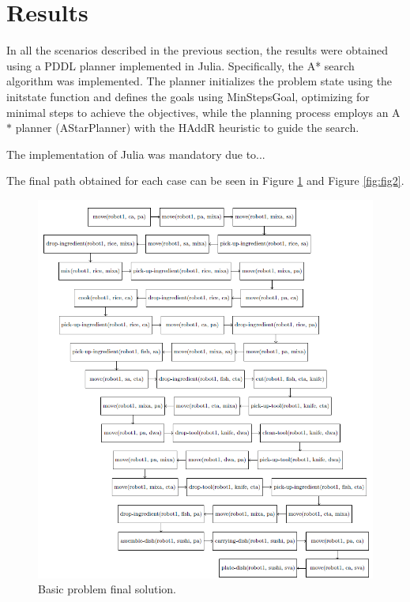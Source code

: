 \section{Results}
In all the scenarios described in the previous section, the results were obtained using a PDDL planner implemented in Julia. 
Specifically, the A* search algorithm was implemented. The planner initializes the problem state using the initstate function and 
defines the goals using MinStepsGoal, optimizing for minimal steps to achieve the objectives, while the planning process employs an A$*$ 
planner (AStarPlanner) with the HAddR heuristic to guide the search.


The implementation of Julia was mandatory due to...


The final path obtained for each case can be seen in Figure \ref{fig:fig1} and Figure \ref{fig:fig2}.

\begin{figure}[t]
    \centering
    \includegraphics[width=1\linewidth]{fig1.png}
    \caption{Basic problem final solution.}
    \label{fig:fig1}
  \end{figure}

